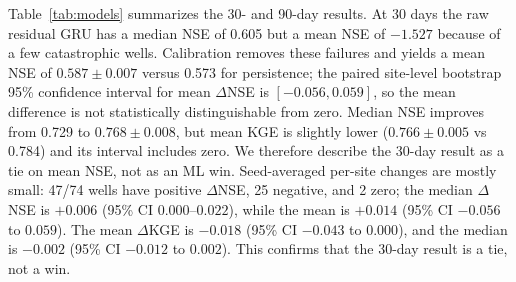 \documentclass[preprint,12pt]{elsarticle}
\begin{document}
Table~\ref{tab:models} summarizes the 30- and 90-day results. At 30 days the
raw residual GRU has a median NSE of 0.605 but a mean NSE of $-1.527$ because
of a few catastrophic wells. Calibration removes these failures and yields a
mean NSE of $0.587 \pm 0.007$ versus 0.573 for persistence; the paired
site-level bootstrap 95\% confidence interval for mean $\Delta$NSE is
$[-0.056, 0.059]$, so the mean difference is not statistically distinguishable
from zero. Median NSE improves from 0.729 to $0.768 \pm 0.008$, but mean KGE is
slightly lower ($0.766 \pm 0.005$ vs 0.784) and its interval includes zero. We
therefore describe the 30-day result as a tie on mean NSE, not as an ML win.
Seed-averaged per-site changes are mostly small: 47/74 wells have positive
$\Delta$NSE, 25 negative, and 2 zero; the median $\Delta$NSE is $+0.006$
(95\% CI $0.000$--$0.022$), while the mean is $+0.014$ (95\% CI $-0.056$ to
$0.059$). The mean $\Delta$KGE is $-0.018$ (95\% CI $-0.043$ to $0.000$), and
the median is $-0.002$ (95\% CI $-0.012$ to $0.002$). This confirms that the
30-day result is a tie, not a win.

\begin{table}[t]
\centering
\caption{Forecast skill on the clean core. Values are mean $\pm$ standard
deviation over seeds 1--3 for the neural models; persistence, seasonal naive,
and ridge are deterministic. All rows use the same evaluation anchors and
target filtering.}
\label{tab:models}
\end{table}
\end{document}
